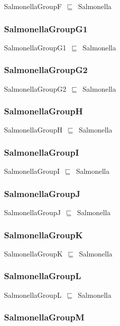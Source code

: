 \documentclass{article}
\begin{document}
SalmonellaGroupF~\ensuremath{\sqsubseteq}~Salmonella~

\subsubsection*{SalmonellaGroupG1}

SalmonellaGroupG1~\ensuremath{\sqsubseteq}~Salmonella~

\subsubsection*{SalmonellaGroupG2}

SalmonellaGroupG2~\ensuremath{\sqsubseteq}~Salmonella~

\subsubsection*{SalmonellaGroupH}

SalmonellaGroupH~\ensuremath{\sqsubseteq}~Salmonella~

\subsubsection*{SalmonellaGroupI}

SalmonellaGroupI~\ensuremath{\sqsubseteq}~Salmonella~

\subsubsection*{SalmonellaGroupJ}

SalmonellaGroupJ~\ensuremath{\sqsubseteq}~Salmonella~

\subsubsection*{SalmonellaGroupK}

SalmonellaGroupK~\ensuremath{\sqsubseteq}~Salmonella~

\subsubsection*{SalmonellaGroupL}

SalmonellaGroupL~\ensuremath{\sqsubseteq}~Salmonella~

\subsubsection*{SalmonellaGroupM}
\end{document}
